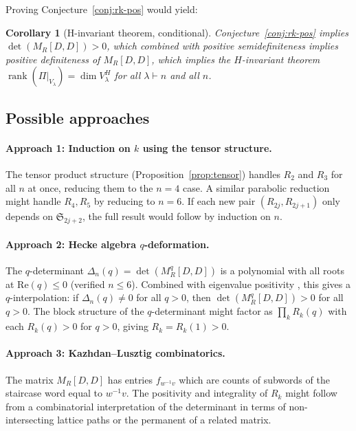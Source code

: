 \documentclass[11pt]{article}
\newtheorem{corollary}[theorem]{Corollary}
\theoremstyle{definition}
\theoremstyle{remark}
\newcommand{\Sym}{\mathfrak{S}}
\newcommand{\rk}{\operatorname{rank}}
\begin{document}
Proving Conjecture~\ref{conj:rk-pos} would yield:

\begin{corollary}[H-invariant theorem, conditional]
\label{cor:conditional}
Conjecture~\ref{conj:rk-pos} implies $\det(M_R[D,D]) > 0$, which
combined with positive semidefiniteness implies positive definiteness
of $M_R[D,D]$, which implies the $H$-invariant theorem
$\rk(\Pi|_{V_\lambda}) = \dim V_\lambda^H$ for all $\lambda \vdash n$
and all $n$.
\end{corollary}

\subsection{Possible approaches}

\paragraph{Approach 1: Induction on $k$ using the tensor structure.}
The tensor product structure (Proposition~\ref{prop:tensor}) handles
$R_2$ and $R_3$ for all $n$ at once, reducing them to the $n=4$ case.
A similar parabolic reduction might handle $R_4, R_5$ by reducing to
$n = 6$.  If each new pair $(R_{2j}, R_{2j+1})$ only depends on
$\Sym_{2j+2}$, the full result would follow by induction on $n$.

\paragraph{Approach 2: Hecke algebra $q$-deformation.}
The $q$-determinant $\Delta_n(q) = \det(M_R^q[D,D])$ is a polynomial
with all roots at $\mathrm{Re}(q) \le 0$ (verified $n \le 6$).
Combined with eigenvalue positivity \cite{Clio-EP}, this gives a
$q$-interpolation: if $\Delta_n(q) \ne 0$ for all $q > 0$, then
$\det(M_R^q[D,D]) > 0$ for all $q > 0$.  The block structure of
the $q$-determinant might factor as $\prod_k R_k(q)$ with each
$R_k(q) > 0$ for $q > 0$, giving $R_k = R_k(1) > 0$.

\paragraph{Approach 3: Kazhdan--Lusztig combinatorics.}
The matrix $M_R[D,D]$ has entries $f_{w^{-1}v}$ which are counts of
subwords of the staircase word equal to $w^{-1}v$.  The positivity
and integrality of $R_k$ might follow from a combinatorial
interpretation of the determinant in terms of non-intersecting lattice
paths or the permanent of a related matrix.
\end{document}
